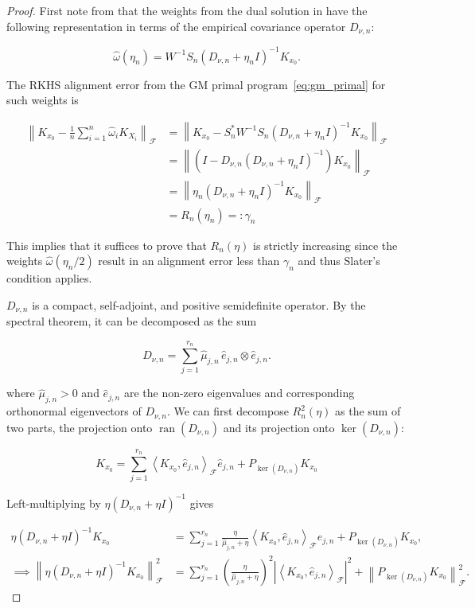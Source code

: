 \documentclass[11pt]{article}
\newcommand{\F}{\mathcal{F}}
\newcommand{\ran}{\operatorname{ran}}
\newcommand{\norm}[1]{\left\lVert #1\right\rVert}
\begin{document}
\begin{proof}

First note from  that the weights from the dual solution in  have the following representation in terms of the empirical covariance operator $D_{\nu,n}$:

\[
  \widehat\omega(\eta_n)=W^{-1}S_n(D_{\nu,n}+\eta_n I)^{-1}K_{x_0}.
\]

The RKHS alignment error from the GM primal program~\eqref{eq:gm_primal} for such weights is 

\begin{align*}
   \norm{K_{x_0} - \frac{1}{n} \sum_{i=1}^n \widehat\omega_i K_{X_i}}_{\F} &= \norm{K_{x_0} - S_n^*W^{-1}S_n(D_{\nu,n} + \eta_n I)^{-1}K_{x_0}}_{\F}\\
   &=\norm{(I - D_{\nu,n}(D_{\nu,n} + \eta_n I)^{-1})K_{x_0}}_{\F}\\
   &= \norm{\eta_n(D_{\nu,n}+\eta_n I)^{-1}K_{x_0}}_{\F} \\
   &=R_n(\eta_n)=:\gamma_n
\end{align*}

This implies that it suffices to prove that $R_n(\eta)$ is strictly increasing since the weights $\widehat\omega(\eta_n/2)$ result in an alignment error less than $\gamma_n$ and thus Slater's condition applies. 

$D_{\nu,n}$ is a compact, self-adjoint, and positive semidefinite operator. By the spectral theorem, it can be decomposed as the sum

\[D_{\nu,n}=\sum_{j=1}^{r_n}\widehat{\mu}_{j,n}\,\widehat e_{j,n}\otimes\widehat e_{j,n}.\]

where $\widehat{\mu}_{j,n}>0$ and $\widehat e_{j,n}$ are the non-zero eigenvalues and corresponding orthonormal eigenvectors of $D_{\nu,n}$. 
We can first decompose $R^2_n(\eta)$ as the sum of two parts, the projection onto $\ran(D_{\nu,n})$ and its projection onto $\ker(D_{\nu,n})$:

\[K_{x_0} =
\sum_{j=1}^{r_n}
\left\langle K_{x_0},\widehat e_{j,n}\right\rangle_{\F}
\widehat e_{j,n}
+
P_{\ker(D_{\nu,n})}K_{x_0}\]

Left-multiplying by $\eta(D_{\nu,n} + \eta I)^{-1}$ gives

\begin{align*}
\eta(D_{\nu,n}+\eta I)^{-1}K_{x_0}
&=
\sum_{j=1}^{r_n}
\frac{\eta}{\widehat\mu_{j,n}+\eta}
\left\langle K_{x_0},\widehat e_{j,n}\right\rangle_{\F}
\widehat e_{j,n}
+
P_{\ker(D_{\nu,n})}K_{x_0},
\\\implies
\left\|
\eta(D_{\nu,n}+\eta I)^{-1}K_{x_0}
\right\|_{\F}^{2}
&=
\sum_{j=1}^{r_n}
\left(
\frac{\eta}{\widehat\mu_{j,n}+\eta}
\right)^2
\left|
\left\langle K_{x_0},\widehat e_{j,n}\right\rangle_{\F}
\right|^2
+
\left\|
P_{\ker(D_{\nu,n})}K_{x_0}
\right\|_{\F}^{2}.
\end{align*}



\end{proof}
\end{document}
